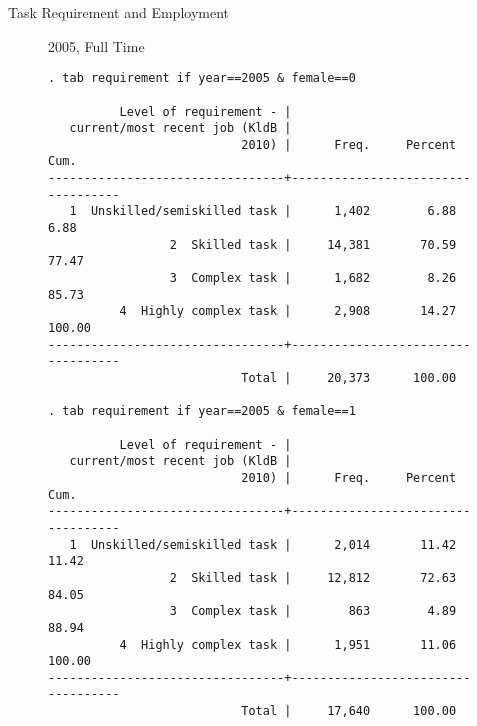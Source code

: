 \documentclass{beamer}
\begin{document}
\begin{frame}[fragile]{Task Requirement and Employment}
\begin{figure}
\centering
\begin{minipage}[b]{0.5\textwidth}{2005, Full Time}
\begin{Verbatim}[fontsize=\tiny]
. tab requirement if year==2005 & female==0

          Level of requirement - |
   current/most recent job (KldB |
                           2010) |      Freq.     Percent        Cum.
---------------------------------+-----------------------------------
   1  Unskilled/semiskilled task |      1,402        6.88        6.88
                 2  Skilled task |     14,381       70.59       77.47
                 3  Complex task |      1,682        8.26       85.73
          4  Highly complex task |      2,908       14.27      100.00
---------------------------------+-----------------------------------
                           Total |     20,373      100.00

. tab requirement if year==2005 & female==1

          Level of requirement - |
   current/most recent job (KldB |
                           2010) |      Freq.     Percent        Cum.
---------------------------------+-----------------------------------
   1  Unskilled/semiskilled task |      2,014       11.42       11.42
                 2  Skilled task |     12,812       72.63       84.05
                 3  Complex task |        863        4.89       88.94
          4  Highly complex task |      1,951       11.06      100.00
---------------------------------+-----------------------------------
                           Total |     17,640      100.00
\end{Verbatim}
\end{minipage}
\end{figure}
\end{frame}
\end{document}
